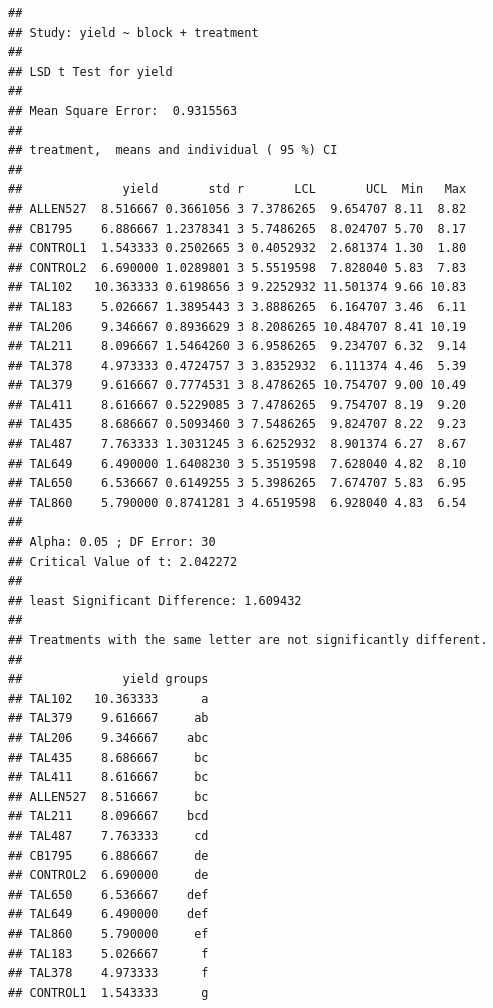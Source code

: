 \documentclass[
]{book}
\begin{document}
\begin{verbatim}
## 
## Study: yield ~ block + treatment
## 
## LSD t Test for yield 
## 
## Mean Square Error:  0.9315563 
## 
## treatment,  means and individual ( 95 %) CI
## 
##              yield       std r       LCL       UCL  Min   Max
## ALLEN527  8.516667 0.3661056 3 7.3786265  9.654707 8.11  8.82
## CB1795    6.886667 1.2378341 3 5.7486265  8.024707 5.70  8.17
## CONTROL1  1.543333 0.2502665 3 0.4052932  2.681374 1.30  1.80
## CONTROL2  6.690000 1.0289801 3 5.5519598  7.828040 5.83  7.83
## TAL102   10.363333 0.6198656 3 9.2252932 11.501374 9.66 10.83
## TAL183    5.026667 1.3895443 3 3.8886265  6.164707 3.46  6.11
## TAL206    9.346667 0.8936629 3 8.2086265 10.484707 8.41 10.19
## TAL211    8.096667 1.5464260 3 6.9586265  9.234707 6.32  9.14
## TAL378    4.973333 0.4724757 3 3.8352932  6.111374 4.46  5.39
## TAL379    9.616667 0.7774531 3 8.4786265 10.754707 9.00 10.49
## TAL411    8.616667 0.5229085 3 7.4786265  9.754707 8.19  9.20
## TAL435    8.686667 0.5093460 3 7.5486265  9.824707 8.22  9.23
## TAL487    7.763333 1.3031245 3 6.6252932  8.901374 6.27  8.67
## TAL649    6.490000 1.6408230 3 5.3519598  7.628040 4.82  8.10
## TAL650    6.536667 0.6149255 3 5.3986265  7.674707 5.83  6.95
## TAL860    5.790000 0.8741281 3 4.6519598  6.928040 4.83  6.54
## 
## Alpha: 0.05 ; DF Error: 30
## Critical Value of t: 2.042272 
## 
## least Significant Difference: 1.609432 
## 
## Treatments with the same letter are not significantly different.
## 
##              yield groups
## TAL102   10.363333      a
## TAL379    9.616667     ab
## TAL206    9.346667    abc
## TAL435    8.686667     bc
## TAL411    8.616667     bc
## ALLEN527  8.516667     bc
## TAL211    8.096667    bcd
## TAL487    7.763333     cd
## CB1795    6.886667     de
## CONTROL2  6.690000     de
## TAL650    6.536667    def
## TAL649    6.490000    def
## TAL860    5.790000     ef
## TAL183    5.026667      f
## TAL378    4.973333      f
## CONTROL1  1.543333      g
\end{verbatim}

  
\end{document}
